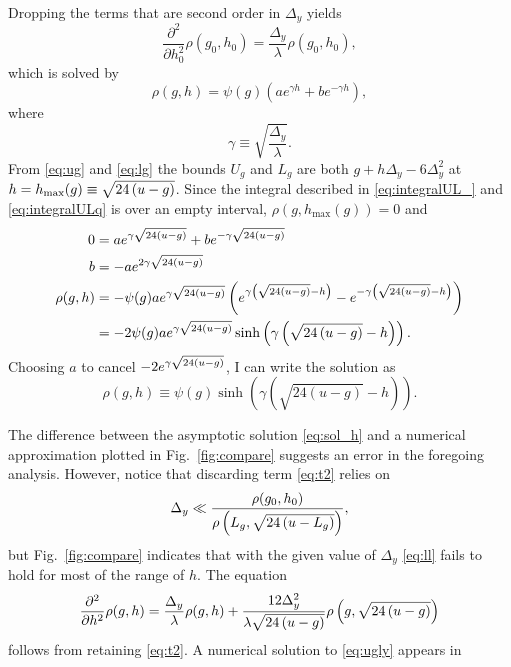 \documentclass[twocolumn]{article}
\begin{document}
Dropping the terms that are second order in $\Delta_y$ yields
\begin{equation*}
  \frac{\partial^2}{\partial h_0^2} \rho(g_0, h_0) =
  \frac{\Delta_y}{\lambda} \rho(g_0, h_0),
\end{equation*}
which is solved by
\begin{equation*}
  \rho(g,h) = \psi(g) \left( a e^{\gamma h} + b e^{-\gamma h}
  \right),
\end{equation*}
where
\begin{equation*}
  \gamma \equiv \sqrt{\frac{\Delta_y}{\lambda}}.
\end{equation*}
From \eqref{eq:ug} and \eqref{eq:lg} the bounds $U_g$ and $L_g$ are
both $g + h\Delta_y -6\Delta_y^2$ at $h = h_{\text{max}}(g) \equiv
\sqrt{24\left(u-g\right)}$.  Since the integral described in \eqref{eq:integralUL_} and
\eqref{eq:integralULq} is over an empty interval,
$\rho(g,h_{\text{max}}(g)) = 0$ and
\begin{align*}
  0 &= a e^{\gamma \sqrt{24\left(u-g\right)}} + b e^{-\gamma \sqrt{24\left(u-g\right)}} \\
  b &= -a e^{2\gamma \sqrt{24\left(u-g\right)}} \\
  \rho(g,h) &= -\psi(g)a e^{\gamma \sqrt{24\left(u-g\right)}} \left(
    e^{\gamma \left( \sqrt{24\left(u-g\right)} - h \right) } -
    e^{-\gamma \left(\sqrt{24\left(u-g\right)} - h \right) } \right) \\
  &= -2 \psi(g)a e^{\gamma \sqrt{24\left(u-g\right)}} \sinh \left( \gamma \left( \sqrt{24\left(u-g\right)}
      - h \right) \right).
\end{align*}
Choosing $a$ to cancel $-2 e^{\gamma \sqrt{24\left(u-g\right)}}$, I can write the solution as
\newcommand{\rhoHG}[2]{\sinh \left( \gamma \left( \sqrt{24(u-#2)} - #1
    \right) \right)}
\begin{equation}
  \label{eq:sol_h}
  \rho(g,h) \equiv \psi(g) \rhoHG{h}{g}.
\end{equation}

The difference between the asymptotic solution \eqref{eq:sol_h} and a
numerical approximation plotted in Fig.~\ref{fig:compare} suggests an
error in the foregoing analysis.  However, notice that discarding term
\eqref{eq:t2} relies on
\begin{equation}
  \label{eq:ll}
  \Delta_y \ll \frac{\rho(g_0, h_0)}{\rho \left(L_g, \sqrt{24\left(u-L_g\right)} \right)},
\end{equation}
but Fig.~\ref{fig:compare} indicates that with the given value of
$\Delta_y$ \eqref{eq:ll} fails to hold for most of the range of $h$.
The equation
\begin{equation}
  \label{eq:ugly}
  \frac{\partial^2}{\partial h^2} \rho(g, h) =
  \frac{\Delta_y}{\lambda} \rho(g, h) +
  \frac{12\Delta_y^2}{\lambda \sqrt{24\left(u-g\right)}} \rho \left(g, \sqrt{24\left(u-g\right)} \right)  
\end{equation}
follows from retaining \eqref{eq:t2}.  A numerical solution to
\eqref{eq:ugly} appears in  %
\end{document}
